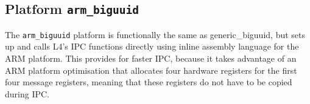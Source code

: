 \subsection{Platform {\tt arm\_biguuid}}
The {\tt arm\_biguuid} platform is functionally the same as generic\_biguuid, but sets up and calls L4's IPC functions directly using inline assembly language for the ARM platform. This provides for faster IPC, because it takes advantage of an ARM platform optimisation that allocates four hardware registers for the first four message registers, meaning that these registers do not have to be copied during IPC.

